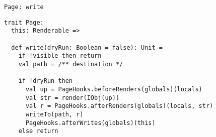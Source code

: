 \documentclass[compress, aspectratio=169]{beamer}
\begin{document}
\begin{frame}[fragile]{\texttt{Page: write}}
    \begin{lstlisting}[style=myscala]
trait Page:
  this: Renderable =>

  def write(dryRun: Boolean = false): Unit =
    if !visible then return
    val path = /** destination */

    if !dryRun then
      val up = PageHooks.beforeRenders(globals)(locals)
      val str = render(IObj(up))
      val r = PageHooks.afterRenders(globals)(locals, str)
      writeTo(path, r)
      PageHooks.afterWrites(globals)(this)
    else return
    \end{lstlisting}
\end{frame}

\end{document}
